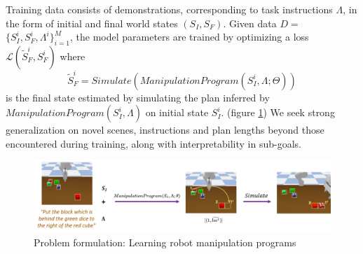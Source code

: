 %
%
Training data consists of demonstrations, corresponding to task instructions $\Lambda$, in the form of initial 
and final 
world states $(S_I, S_F)$.
%
Given data $D$$=$$\{ S^{i}_I, S^{i}_F, \Lambda^{i} \}^{M}_{i=1}$, the model parameters are trained by optimizing a loss 
$\mathcal{L}(\tilde{S}_F^{i},S_F^{i})$
%
where 
\begin{equation}
\tilde{S}_F^{i}=Simulate(ManipulationProgram(S_I^{i}, \Lambda; \Theta))
\end{equation} is the final state estimated by simulating the plan inferred by $ManipulationProgram(S_I^{i}, \Lambda)$ on initial state $S_I^i$. (figure \ref{fig:problem-1}) 
% 
We seek strong generalization on novel scenes, instructions and plan lengths 
beyond those encountered during training, along with interpretability in sub-goals. 

\begin{figure}
    \centering
    \includegraphics[width=\textwidth]{assets/part1-problem.png}
    \caption{Problem formulation: Learning robot manipulation programs}
    \label{fig:problem-1}
\end{figure}